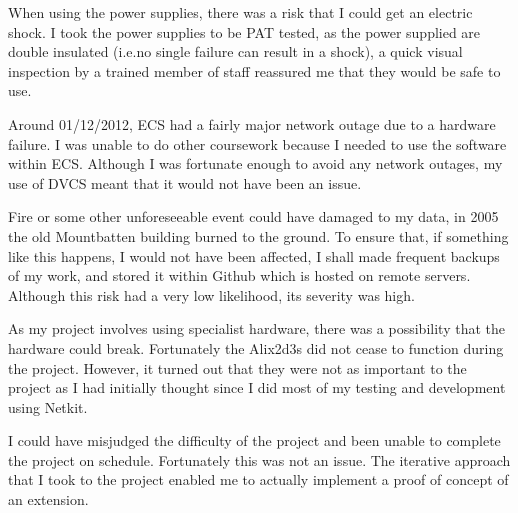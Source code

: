 \documentclass[12pt]{report}
\begin{document}
When using the power supplies, there was a risk that I could get an electric
shock. I took the power supplies to be PAT tested, as the power supplied are
double insulated (i.e.\@ no single failure can result in a shock), a quick visual
inspection by a trained member of staff reassured me that they would be safe to
use.

Around 01/12/2012, ECS had a fairly major network outage due to a hardware
failure. I was unable to do other coursework because I needed to use the
software within ECS\@. Although I was fortunate enough to avoid any network
outages, my use of DVCS meant that it would not have been an issue.

Fire or some other unforeseeable event could have damaged to my data, in 2005 the old
Mountbatten building burned to the ground. To ensure that, if something like
this happens, I would not have been affected, I shall made frequent backups of
my work, and stored it within Github which is hosted on remote servers.
Although this risk had a very low likelihood, its severity was high.

As my project involves using specialist hardware, there was a possibility that
the hardware could break. Fortunately the Alix2d3s did not cease to function
during the project. However, it turned out that they were not as important to
the project as I had initially thought since I did most of my testing and
development using Netkit.

I could have misjudged the difficulty of the project and been unable to complete
the project on schedule. Fortunately this was not an issue. The iterative
approach that I took to the project enabled me to actually implement a proof of
concept of an extension.  
\end{document}
